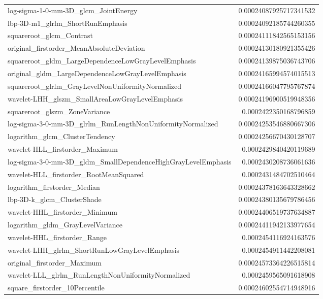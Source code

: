 {\begin{xltabular}[H]{\textwidth}{X r}
        log-sigma-1-0-mm-3D\_glcm\_JointEnergy & 0.00024087925717341532 \\
        lbp-3D-m1\_glrlm\_ShortRunEmphasis & 0.00024092185744260355 \\
        squareroot\_glcm\_Contrast & 0.00024111842565153156 \\
        original\_firstorder\_MeanAbsoluteDeviation & 0.00024130180921355426 \\
        squareroot\_gldm\_LargeDependenceLowGrayLevelEmphasis & 0.00024139875036743706 \\
        original\_gldm\_LargeDependenceLowGrayLevelEmphasis & 0.00024165994574015513 \\
        squareroot\_glrlm\_GrayLevelNonUniformityNormalized & 0.00024166047795767874 \\
        wavelet-LHH\_glszm\_SmallAreaLowGrayLevelEmphasis & 0.00024196900519948356 \\
        squareroot\_glszm\_ZoneVariance & 0.0002422350168796859 \\
        log-sigma-3-0-mm-3D\_glrlm\_RunLengthNonUniformityNormalized & 0.00024253546880667306 \\
        logarithm\_glcm\_ClusterTendency & 0.00024256670430128707 \\
        wavelet-HLL\_firstorder\_Maximum & 0.0002429840420119689 \\
        log-sigma-3-0-mm-3D\_gldm\_SmallDependenceHighGrayLevelEmphasis & 0.0002430208736061636 \\
        wavelet-HLL\_firstorder\_RootMeanSquared & 0.0002431484702510464 \\
        logarithm\_firstorder\_Median & 0.00024378163643328662 \\
        lbp-3D-k\_glcm\_ClusterShade & 0.00024380135679786456 \\
        wavelet-HHL\_firstorder\_Minimum & 0.00024406519737634887 \\
        logarithm\_gldm\_GrayLevelVariance & 0.00024411942133977654 \\
        wavelet-HHL\_firstorder\_Range & 0.0002454116924163576 \\
        wavelet-LHH\_glrlm\_ShortRunLowGrayLevelEmphasis & 0.0002454911442208081 \\
        original\_firstorder\_Maximum & 0.00024573364226515814 \\
        wavelet-LLL\_glrlm\_RunLengthNonUniformityNormalized & 0.0002459565091618908 \\
        square\_firstorder\_10Percentile & 0.00024602554714948916 \\

\end{xltabular}}
